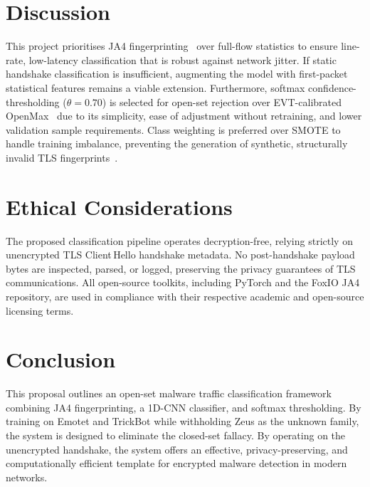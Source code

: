 \documentclass[12pt,a4paper]{report}
\begin{document}
\section{Discussion}
This project prioritises JA4 fingerprinting~\cite{althouse2023ja4} over full-flow statistics to ensure line-rate, low-latency classification that is robust against network jitter. If static handshake classification is insufficient, augmenting the model with first-packet statistical features remains a viable extension. Furthermore, softmax confidence-thresholding ($\theta = 0.70$) is selected for open-set rejection over EVT-calibrated OpenMax~\cite{bendale2016openmax} due to its simplicity, ease of adjustment without retraining, and lower validation sample requirements. Class weighting is preferred over SMOTE to handle training imbalance, preventing the generation of synthetic, structurally invalid TLS fingerprints~\cite{groupreweight2024}.

\section{Ethical Considerations}
The proposed classification pipeline operates decryption-free, relying strictly on unencrypted TLS Client\,Hello handshake metadata. No post-handshake payload bytes are inspected, parsed, or logged, preserving the privacy guarantees of TLS communications. All open-source toolkits, including PyTorch and the FoxIO JA4 repository, are used in compliance with their respective academic and open-source licensing terms.

\section{Conclusion}
This proposal outlines an open-set malware traffic classification framework combining JA4 fingerprinting, a 1D-CNN classifier, and softmax thresholding. By training on Emotet and TrickBot while withholding Zeus as the unknown family, the system is designed to eliminate the closed-set fallacy. By operating on the unencrypted handshake, the system offers an effective, privacy-preserving, and computationally efficient template for encrypted malware detection in modern networks.
\end{document}
